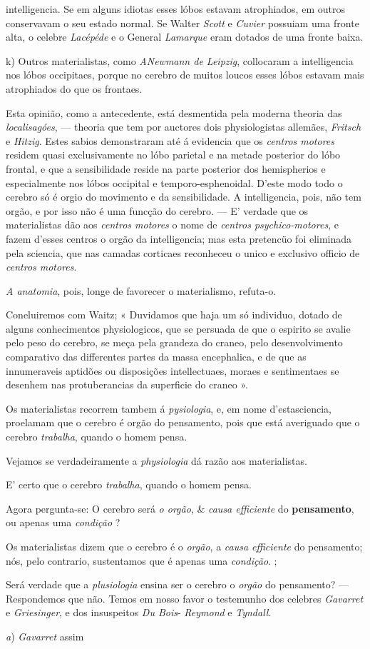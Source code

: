 intelligencia. Se em alguns idiotas esses lóbos estavam atrophiados, em outros conservavam o seu estado normal. Se Walter \emph{Scott} e \emph{Cuvier} possuiam uma fronte alta, o celebre \emph{Lacépéde} e o General \emph{Lamarque} eram dotados de uma fronte baixa.\par k) Outros materialistas, como \emph{ANewmann de Leipzig}, collocaram a intelligencia nos lóbos occipitaes, porque no cerebro de muitos loucos esses lóbos estavam mais atrophiados do que os frontaes.\par Esta opinião, como a antecedente, está desmentida pela moderna theoria das \emph{localisagóes}, --- theoria que tem por auctores dois physiologistas allemães, \emph{Fritsch} e \emph{Hitzig}. Estes sabios demonstraram até á evidencia que os \emph{centros motores} residem quasi exclusivamente no lóbo parietal e na metade posterior do lóbo frontal, e que a sensibilidade reside na parte posterior dos hemispherios e especialmente nos lóbos occipital e temporo-esphenoidal. D'este modo todo o cerebro só é orgio do movimento e da sensibilidade. A intelligencia, pois, não tem orgão, e por isso não é uma funcção do cerebro. --- E' verdade que os materialistas dão aos \emph{centros motores} o nome de \emph{centros psychico-motores}, e fazem d'esses centros o orgão da intelligencia; mas esta pretencüo foi eliminada pela sciencia, que nas camadas corticaes reconheceu o unico e exclusivo officio de \emph{centros motores}.\par \emph{A anatomia}, pois, longe de favorecer o materialismo, refuta-o.\par Coneluiremos com Waitz; « Duvidamos que haja um só individuo, dotado de alguns conhecimentos physiologicos, que se persuada de que o espirito se avalie pelo peso do cerebro, se meça pela grandeza do craneo, pelo desenvolvimento comparativo das differentes partes da massa encephalica, e de que as innumeraveis aptidões ou disposições intellectuaes, moraes e sentimentaes se desenhem nas protuberancias da superficie do craneo ».\par Os materialistas recorrem tambem á \emph{pysiologia}, e, em nome d'estasciencia, proelamam que o cerebro é orgão do pensamento, pois que está averiguado que o cerebro \emph{trabalha}, quando o homem pensa.\par Vejamos se verdadeiramente a \emph{physiologia} dá razão aos materialistas.\par E' certo que o cerebro \emph{trabalha}, quando o homem pensa.\par Agora pergunta-se: O cerebro será \emph{o orgão}, \& \emph{causa efficiente} do \textbf{pensamento}, ou apenas uma \emph{condição} ?\par Os materialistas dizem que o cerebro é o \emph{orgão}, a \emph{causa efficiente} do pensamento; nós, pelo contrario, sustentamos que é apenas uma \emph{condição}. ;\par Será verdade que a \emph{plusiologia} ensina ser o cerebro o \emph{orgão} do pensamento? --- Respondemos que não. Temos em nosso favor o testemunho dos celebres \emph{Gavarret} e \emph{Griesinger}, e dos insuspeitos \emph{Du Bois}- \emph{Reymond} e \emph{Tyndall}.\par \emph{a}) \emph{Gavarret} assim 